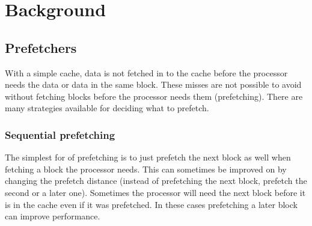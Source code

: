 \section{Background}
\label{sec:background}
\subsection{Prefetchers}


With a simple cache, data is not fetched in to the cache before the
processor needs the data or data in the same block. These misses
are not possible to avoid without fetching blocks before the
processor needs them (prefetching). There are many strategies
available for deciding what to prefetch.

\subsubsection{Sequential prefetching}

The simplest for of prefetching is to just prefetch the next block
as well when fetching a block the processor needs. This can
sometimes be improved on by changing the prefetch distance (instead
of prefetching the next block, prefetch the second or a later one).
Sometimes the processor will need the next block before it is in
the cache even if it was prefetched. In these cases prefetching a
later block can improve performance.

